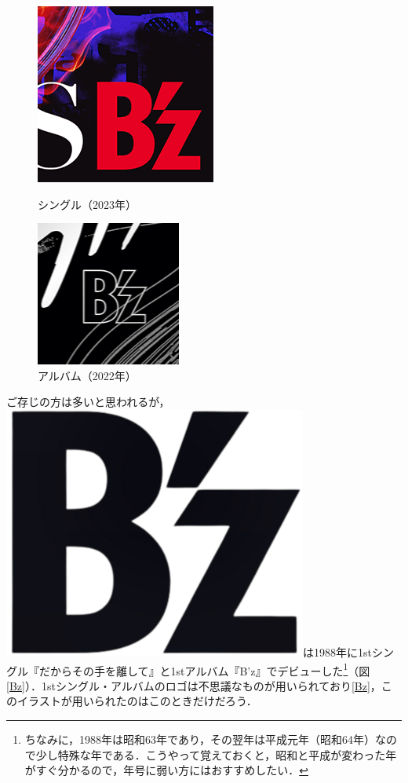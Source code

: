 \documentclass[a4paper,uplatex,dvipdfmx]{jsarticle}
\theoremstyle{definition}
\begin{document}
\begin{figure}[ht]  
  \centering
  \begin{minipage}[t]{0.48\columnwidth}
    \centering
    \includegraphics[width=.7\hsize]{fig/Bz/stars_2023.png}
    \caption{シングル（2023年）}
    \label{STARS}
  \end{minipage}
  \begin{minipage}[t]{0.48\columnwidth}
    \centering
    \includegraphics[width=.7\hsize]{fig/Bz/highwayX_2022.png}
    \caption{アルバム（2022年）}
    \label{HighwayX}
  \end{minipage}
\end{figure}

ご存じの方は多いと思われるが，\includegraphics[width=0.02\linewidth]{fig/Bz/logo.png}は1988年に1stシングル『だからその手を離して』と1stアルバム『B'z』でデビューした\footnote{
  ちなみに，1988年は昭和63年であり，その翌年は平成元年（昭和64年）なので少し特殊な年である．こうやって覚えておくと，昭和と平成が変わった年がすぐ分かるので，年号に弱い方にはおすすめしたい．
}（図\ref{Bz}）．1stシングル・アルバムのロゴは不思議なものが用いられており\ref{Bz}，このイラストが用いられたのはこのときだけだろう．
\end{document}
